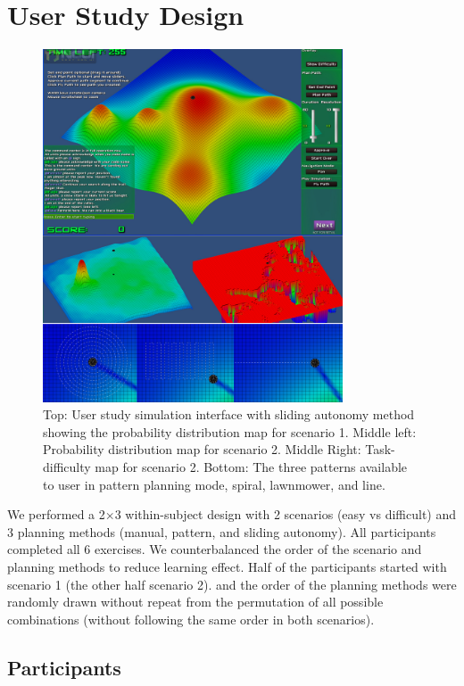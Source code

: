 \documentclass[journal]{IEEEtran}
\begin{document}
\section{User Study Design} 
\label{sec:Design}

\begin{figure}
\centering
\includegraphics[width=3.5in]{UserStudy.JPG}
\caption{Top: User study simulation interface with sliding autonomy method showing the probability distribution map for scenario 1. Middle left: Probability distribution map for scenario 2. Middle Right: Task-difficulty map for scenario 2. Bottom: The three patterns available to user in pattern planning mode, spiral, lawnmower, and line.}
\label{UserStudy}
\end{figure}

We performed a 2$\times$3 within-subject design with 2 scenarios (easy vs difficult) and 3 planning methods (manual, pattern, and sliding autonomy). All participants completed all 6 exercises. We counterbalanced the order of the scenario and planning methods to reduce learning effect. Half of the participants started with scenario 1 (the other half scenario 2). and the order of the planning methods were randomly drawn without repeat from the permutation of all possible combinations (without following the same order in both scenarios).

\subsection{Participants}
\end{document}
